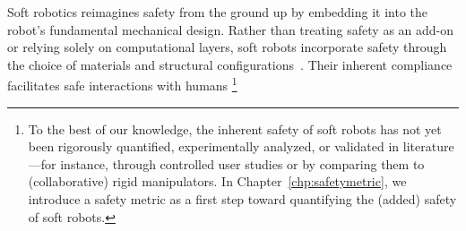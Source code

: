 Soft robotics reimagines safety from the ground up by embedding it into the robot’s fundamental mechanical design. Rather than treating safety as an add-on or relying solely on computational layers, soft robots incorporate safety through the choice of materials and structural configurations~\citep{rus2015design, laschi2016soft}. Their inherent compliance facilitates safe interactions with humans
\footnote{
To the best of our knowledge, the inherent safety of soft robots has not yet been rigorously quantified, experimentally analyzed, or validated in literature—for instance, through controlled user studies or by comparing them to (collaborative) rigid manipulators. In Chapter~\ref{chp:safetymetric}, we introduce a safety metric as a first step toward quantifying the (added) safety of soft robots.
} 
